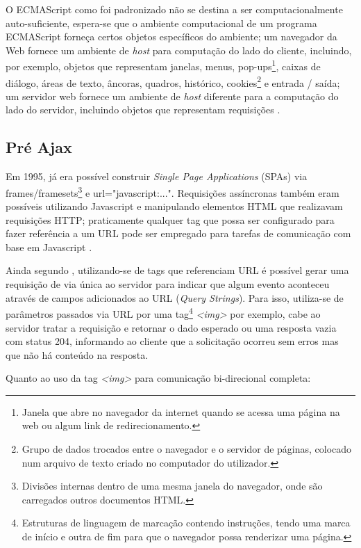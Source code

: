 O ECMAScript como foi padronizado não se destina a ser computacionalmente auto-suficiente, espera-se que o ambiente computacional de um programa ECMAScript forneça certos objetos específicos do ambiente; um navegador da Web fornece um ambiente de \emph{host} para computação do lado do cliente, incluindo, por exemplo, objetos que representam janelas, menus, pop-ups\footnote{Janela que abre no navegador da internet quando se acessa uma página na web ou algum link de redirecionamento.}, caixas de diálogo, áreas de texto, âncoras, quadros, histórico, cookies\footnote{Grupo de dados trocados entre o navegador e o servidor de páginas, colocado num arquivo de texto criado no computador do utilizador.} e entrada / saída; um servidor web fornece um ambiente de \emph{host} diferente para a computação do lado do servidor, incluindo objetos que representam requisições \cite{ecmascript2016}.

\subsection{Pré Ajax}

Em 1995, já era possível construir \emph{Single Page Applications} (SPAs) via frames/framesets\footnote{Divisões internas dentro de uma mesma janela do navegador, onde são carregados outros documentos HTML.} e url="javascript:...". Requisições assíncronas também eram possíveis utilizando Javascript e manipulando elementos HTML que realizavam requisições HTTP; praticamente qualquer tag que possa ser configurado para fazer referência a um URL pode ser empregado para tarefas de comunicação com base em Javascript \cite{powell2008ajax}.

Ainda segundo , utilizando-se de tags que referenciam URL é possível gerar uma requisição de via única ao servidor para indicar que algum evento aconteceu através de campos adicionados ao URL (\emph{Query Strings}). Para isso, utiliza-se de parâmetros passados via URL por uma tag\footnote{Estruturas de linguagem de marcação contendo instruções, tendo uma marca de início e outra de fim para que o navegador possa renderizar uma página.} \emph{<img>} por exemplo, cabe ao servidor tratar a requisição e retornar o dado esperado ou uma resposta vazia com status 204, informando ao cliente que a solicitação ocorreu sem erros mas que não há conteúdo na resposta.

Quanto ao uso da tag \emph{<img>} para comunicação bi-direcional  completa:

